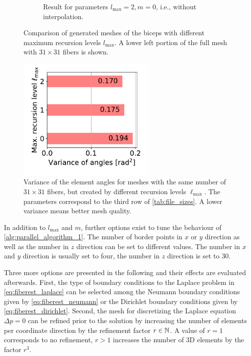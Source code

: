 \begin{figure}
\begin{subfigure}[t]{0.45\textwidth}
    \caption{Result for parameters $l_\text{max}=2, m=0$, i.e., without interpolation.}%
    \label{fig:31x31_l2_center}%
  \end{subfigure}   
   
  \caption{Comparison of generated meshes of the biceps with different maximum recursion levels $l_\text{max}$. A lower left portion of the full mesh with $31 \times 31$ fibers is shown.}%
  \label{fig:different_recursion_levels}%
\end{figure}%

\begin{figure}%
  \centering%
  \includegraphics[height=6cm]{images/parallel_fiber_estimation/mesh_quality_recursion_level.pdf}%
  \caption{Variance of the element angles for meshes with the same number of $31 \times 31$ fibers, but created by different recursion levels $\ell_\text{max}$. The parameters correspond to the third row of \cref{tab:file_sizes}. A lower variance means better mesh quality.}%
  \label{fig:2mesh_quality}%
\end{figure}%

In addition to $l_\text{max}$ and $m$, further options exist to tune the behaviour of \cref{alg:parallel_algorithm_1}.
The number of border points in $x$ or $y$ direction as well as the number in $z$ direction can be set to different values. The number in $x$ and $y$ direction is usually set to four, the number in $z$ direction is set to 30.

Three more options are presented in the following and their effects are evaluated afterwards. First, the type of boundary conditions to the Laplace problem in \cref{eq:fiberest_laplace} can be selected among the Neumann boundary conditions given by \cref{eq:fiberest_neumann} or the Dirichlet boundary conditions given by \cref{eq:fiberest_dirichlet}.
Second, the mesh for discretizing the Laplace equation $Δp=0$ can be refined prior to the solution by increasing the number of elements per coordinate direction by the refinement factor $r \in \mathbb{N}$. A value of $r=1$ corresponds to no refinement, $r>1$ increases the number of 3D elements by the factor $r^3$.

